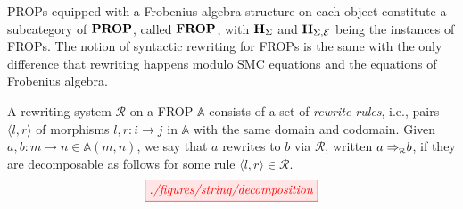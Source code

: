 PROPs equipped with a Frobenius algebra structure on each object constitute a subcategory of $\mathbf{PROP}$, called $\mathbf{FROP}$, with $\mathbf{H}_{\Sigma}$ and $\mathbf{H}_{\Sigma, \mathcal{E}}$ being the instances of FROPs.
The notion of syntactic rewriting for FROPs is the same with the only difference that rewriting happens modulo SMC equations and the equations of Frobenius algebra.
\begin{definition}\label{def:rewriting_frob}
 A rewriting system $\mathcal{R}$ on a FROP $\mathbb{A}$ consists of a set of \emph{rewrite rules}, i.e., pairs $\langle l, r \rangle$ of morphisms $l,r : i \to j$ in $\mathbb{A}$ with the same domain and codomain.
 Given $a,b : m \to n \in \mathbb{A}(m,n)$, we say that $a$ rewrites to $b$ via $\mathcal{R}$, written $a \Rightarrow{}_{\mkern-8mu\scriptscriptstyle{\mathcal{R}}} b$, if they are decomposable as follows for some rule $\langle l,r \rangle \in \mathcal{R}$.
 \[
\tikzfig{./figures/string/decomposition} 
 \] 
\end{definition}

